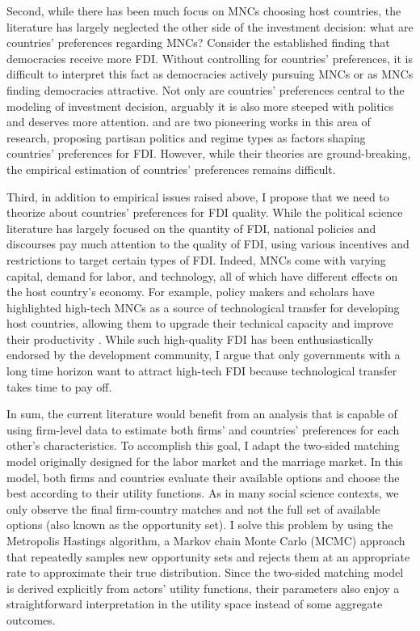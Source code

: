 Second, while there has been much focus on MNCs choosing host countries, the literature has largely neglected the other side of the investment decision: what are countries' preferences regarding MNCs? Consider the established finding that democracies receive more FDI. Without controlling for countries' preferences, it is difficult to interpret this fact as democracies actively pursuing MNCs or as MNCs finding democracies attractive. Not only are countries' preferences central to the modeling of investment decision, arguably it is also more steeped with politics and deserves more attention. \citet{Pinto2013} and \citet{Pandya2016} are two pioneering works in this area of research, proposing partisan politics and regime types as factors shaping countries' preferences for FDI. However, while their theories are ground-breaking, the empirical estimation of countries' preferences remains difficult.

Third, in addition to empirical issues raised above, I propose that we need to theorize about countries' preferences for FDI quality. While the political science literature has largely focused on the quantity of FDI, national policies and discourses pay much attention to the quality of FDI, using various incentives and restrictions to target certain types of FDI. Indeed, MNCs come with varying capital, demand for labor, and technology, all of which have different effects on the host country's economy. For example, policy makers and scholars have highlighted high-tech MNCs as a source of technological transfer for developing host countries, allowing them to upgrade their technical capacity and improve their productivity \citep{Findlay1978, Nunnenkamp2004}. While such high-quality FDI has been enthusiastically endorsed by the development community, I argue that only governments with a long time horizon want to attract high-tech FDI because technological transfer takes time to pay off.

In sum, the current literature would benefit from an analysis that is capable of using firm-level data to estimate both firms' and countries' preferences for each other's characteristics. To accomplish this goal, I adapt the two-sided matching model originally designed for the labor market and the marriage market. In this model, both firms and countries evaluate their available options and choose the best according to their utility functions. As in many social science contexts, we only observe the final firm-country matches and not the full set of available options (also known as the opportunity set). I solve this problem by using the Metropolis Hastings algorithm, a Markov chain Monte Carlo (MCMC) approach that repeatedly samples new opportunity sets and rejects them at an appropriate rate to approximate their true distribution. Since the two-sided matching model is derived explicitly from actors' utility functions, their parameters also enjoy a straightforward interpretation in the utility space instead of some aggregate outcomes.

